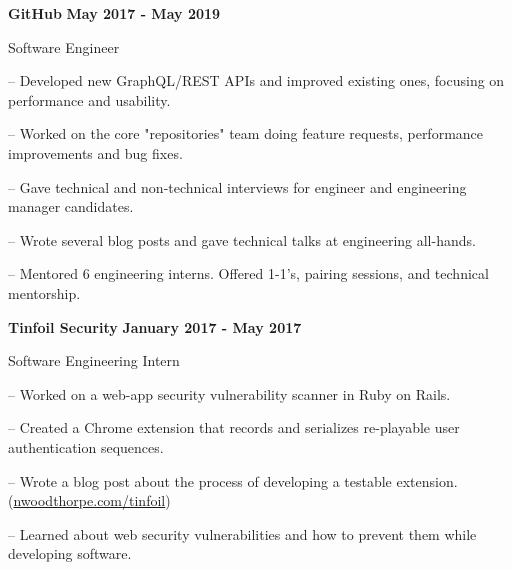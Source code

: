\documentclass[12pt]{extarticle}
\begin{document}
{    \vspace{0.3cm}

    {\indent
        \textbf{GitHub} \hfill \textbf{May 2017 - May 2019}

        Software Engineer

        \begin{compactitem}
            \setlength{\itemindent}{0.5cm}
            \item[--] Developed new GraphQL/REST APIs and improved existing ones, focusing on performance and usability.
            \item[--] Worked on the core "repositories" team doing feature requests, performance improvements and bug fixes.
            \item[--] Gave technical and non-technical interviews for engineer and engineering manager candidates.
            \item[--] Wrote several blog posts and gave technical talks at engineering all-hands.
            \item[--] Mentored 6 engineering interns. Offered 1-1's, pairing sessions, and technical mentorship.
        \end{compactitem}
    }

    \vspace{0.3cm}

    {\indent
        \textbf{Tinfoil Security} \hfill \textbf{January 2017 - May 2017}

        Software Engineering Intern

        \begin{compactitem}
            \setlength{\itemindent}{0.5cm}
            \item[--] Worked on a web-app security vulnerability scanner in Ruby on Rails.
            \item[--] Created a Chrome extension that records and serializes re-playable user authentication sequences.
            \item[--] Wrote a blog post about the process of developing a testable extension. (\href{http://nwoodthorpe.com/tinfoil}{nwoodthorpe.com/tinfoil})
            \item[--] Learned about web security vulnerabilities and how to prevent them while developing software.
        \end{compactitem}
    }

    \vspace{1cm}
    \\

}
\end{document}
